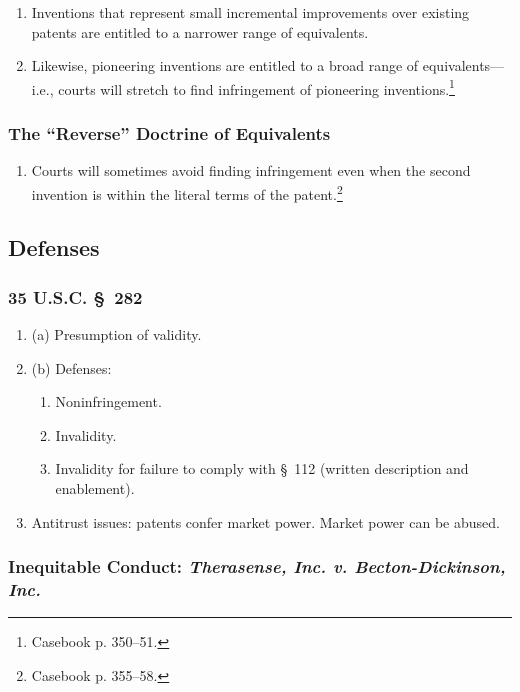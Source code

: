 \begin{enumerate}
    \item Inventions that represent small incremental improvements over 
    existing patents are entitled to a narrower range of equivalents.
    \item Likewise, pioneering inventions are entitled to a broad range of 
    equivalents---i.e., courts will stretch to find infringement of pioneering 
    inventions.\footnote{Casebook p. 350--51.}
\end{enumerate}

\subsubsection{The ``Reverse'' Doctrine of Equivalents}

\begin{enumerate}
    \item Courts will sometimes avoid finding infringement even when the 
    second invention is within the literal terms of the 
    patent.\footnote{Casebook p. 355--58.}
\end{enumerate}

\subsection{Defenses}

\subsubsection{35 U.S.C. \S\ 282}

\begin{enumerate}
    \item (a) Presumption of validity.
    \item (b) Defenses:
    \begin{enumerate}
        \item Noninfringement.
        \item Invalidity.
        \item Invalidity for failure to comply with \S\ 112 (written 
        description and enablement).
    \end{enumerate}
    \item Antitrust issues: patents confer market power. Market power can be 
    abused.
\end{enumerate}

\subsubsection{Inequitable Conduct: \emph{Therasense, Inc. v. Becton-Dickinson, 
Inc.}}

